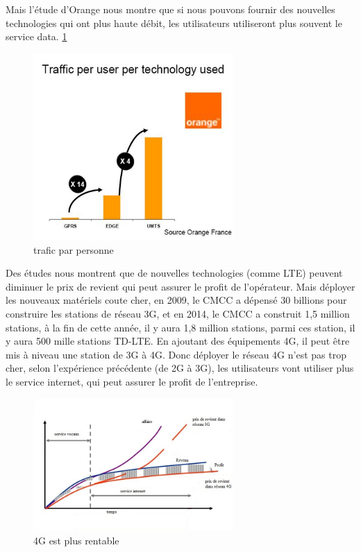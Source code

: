Mais l'étude d'Orange nous montre que si nous pouvons fournir des nouvelles technologies qui ont plus haute débit, les utilisateurs utiliseront plus souvent le service data.  \ref{traficparpersonne}
  \begin{figure}[H]
   \centering
   \includegraphics[width=3in]{images/orange.JPG}
   \caption{trafic par personne }
   \label{traficparpersonne}
  \end{figure}
 Des études nous montrent que de nouvelles technologies (comme LTE) peuvent diminuer le prix de revient qui peut assurer le profit de l'opérateur. Mais déployer les nouveaux matériels coute cher, en 2009, le CMCC a dépensé 30 billions \textyen pour construire les stations de réseau 3G, et en 2014, le CMCC a construit 1,5 million stations, à la fin de cette année, il y aura 1,8 million stations, parmi ces station, il y aura 500 mille stations TD-LTE. En ajoutant des équipements 4G, il peut être mis à niveau une station de 3G à 4G. Donc déployer le réseau 4G n'est pas trop cher, selon l'expérience précédente (de 2G à 3G), les utilisateurs vont utiliser plus le service internet, qui peut assurer le profit de l'entreprise.
      \begin{figure}[H]
          \centering
          \includegraphics[width=3in]{images/why4G.jpg}
          \caption{4G est plus rentable}
          \label{why4G}
      \end{figure}
      
